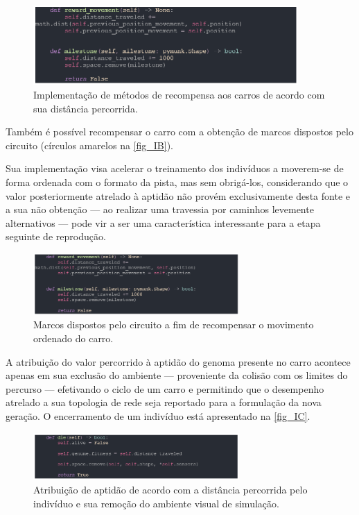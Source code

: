 \begin{figure}[htb]
        \centering
        \caption{\label{fig_IA}Implementação de métodos de recompensa aos carros de acordo com sua distância percorrida.}
        \includegraphics[width=0.9\textwidth]{images/IA.png}
\end{figure}

Também é possível recompensar o carro com a obtenção de marcos dispostos pelo circuito (círculos amarelos na \autoref{fig_IB}). 

Sua implementação visa acelerar o treinamento dos indivíduos a moverem-se de forma ordenada com o
formato da pista, mas sem obrigá-los, considerando que o valor posteriormente atrelado à aptidão não
provém exclusivamente desta fonte e a sua não obtenção — ao realizar uma travessia por caminhos levemente
alternativos — pode vir a ser uma característica interessante para a etapa seguinte de reprodução.

\begin{figure}[htb]
        \centering
        \caption{\label{fig_IB}Marcos dispostos pelo circuito a fim de recompensar o movimento ordenado do carro.}
        \includegraphics[width=0.7\textwidth]{images/IB.png}
\end{figure}

A atribuição do valor percorrido à aptidão do genoma presente no carro acontece apenas em sua exclusão do ambiente
— proveniente da colisão com os limites do percurso — efetivando o ciclo de um carro e permitindo que o desempenho atrelado a
sua topologia de rede seja reportado para a formulação da nova geração. O encerramento de um indivíduo está apresentado na \autoref{fig_IC}.

\begin{figure}[htb]
        \centering
        \caption{\label{fig_IC}Atribuição de aptidão de acordo com a distância percorrida pelo indivíduo e sua remoção do ambiente visual de simulação.}
        \includegraphics[width=0.7\textwidth]{images/IC.png}
\end{figure}

